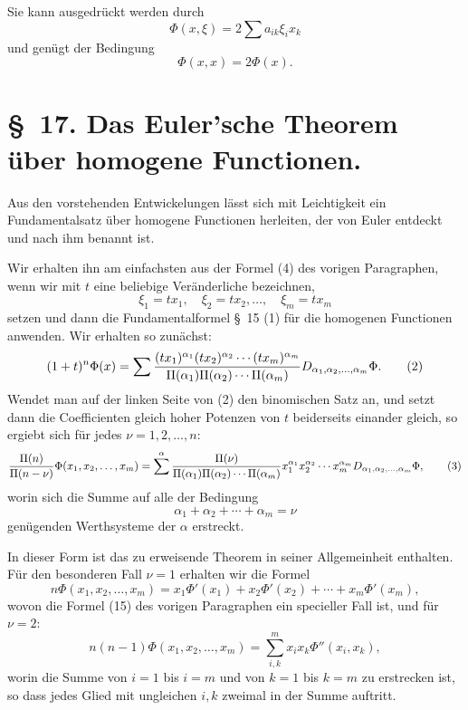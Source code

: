 \documentclass[11pt]{article}
\begin{document}
Sie kann ausgedrückt werden durch
\begin{equation}
 \Phi(x,\xi)=2\sum a_{ik}\xi_i x_k
\tag{14}
\end{equation}
und genügt der Bedingung
\begin{equation}
 \Phi(x,x)=2\Phi(x).
\tag{15}
\end{equation}

\section*{\S~17. Das Euler'sche Theorem über homogene Functionen.}

Aus den vorstehenden Entwickelungen lässt sich mit Leichtigkeit ein Fundamentalsatz über homogene Functionen herleiten, der von Euler entdeckt und nach ihm benannt ist.

Wir erhalten ihn am einfachsten aus der Formel (4) des vorigen Paragraphen, wenn wir mit $t$ eine beliebige Veränderliche bezeichnen,
\begin{equation}
 \xi_1=tx_1,\quad \xi_2=tx_2,\ldots,\quad \xi_m=tx_m
\tag{1}
\end{equation}
setzen und dann die Fundamentalformel \S~15 (1) für die homogenen Functionen anwenden. Wir erhalten so zunächst:
\begin{equation}
 (1+t)^n\Phi(x)
 =
 \sum { (tx_1)^{\alpha_1}(tx_2)^{\alpha_2}\cdots(tx_m)^{\alpha_m}
 \over \Pi(\alpha_1)\Pi(\alpha_2)\cdots\Pi(\alpha_m)}
 D_{\alpha_1,\alpha_2,\ldots,\alpha_m}\Phi.
\tag{2}
\end{equation}
Wendet man auf der linken Seite von (2) den binomischen Satz an, und setzt dann die Coefficienten gleich hoher Potenzen von $t$ beiderseits einander gleich, so ergiebt sich für jedes $\nu=1,2,\ldots,n$:
\begin{equation}
 {\Pi(n)\over\Pi(n-\nu)}\Phi(x_1,x_2,\ldots,x_m)
 =
 \sum^{\alpha}
 {\Pi(\nu)\over\Pi(\alpha_1)\Pi(\alpha_2)\cdots\Pi(\alpha_m)}
 x_1^{\alpha_1}x_2^{\alpha_2}\cdots x_m^{\alpha_m}
 D_{\alpha_1,\alpha_2,\ldots,\alpha_m}\Phi,
\tag{3}
\end{equation}
worin sich die Summe auf alle der Bedingung
\begin{equation}
 \alpha_1+\alpha_2+\cdots+\alpha_m=\nu
\tag{4}
\end{equation}
genügenden Werthsysteme der $\alpha$ erstreckt.

In dieser Form ist das zu erweisende Theorem in seiner Allgemeinheit enthalten. Für den besonderen Fall $\nu=1$ erhalten wir die Formel
\begin{equation}
 n\Phi(x_1,x_2,\ldots,x_m)
 =x_1\Phi'(x_1)+x_2\Phi'(x_2)+\cdots+x_m\Phi'(x_m),
\tag{5}
\end{equation}
wovon die Formel (15) des vorigen Paragraphen ein specieller Fall ist, und für $\nu=2$:
\begin{equation}
 n(n-1)\Phi(x_1,x_2,\ldots,x_m)
 =
 \sum_{i,k}^{m}x_i x_k\Phi''(x_i,x_k),
\tag{6}
\end{equation}
worin die Summe von $i=1$ bis $i=m$ und von $k=1$ bis $k=m$ zu erstrecken ist, so dass jedes Glied mit ungleichen $i,k$ zweimal in der Summe auftritt.
\end{document}
